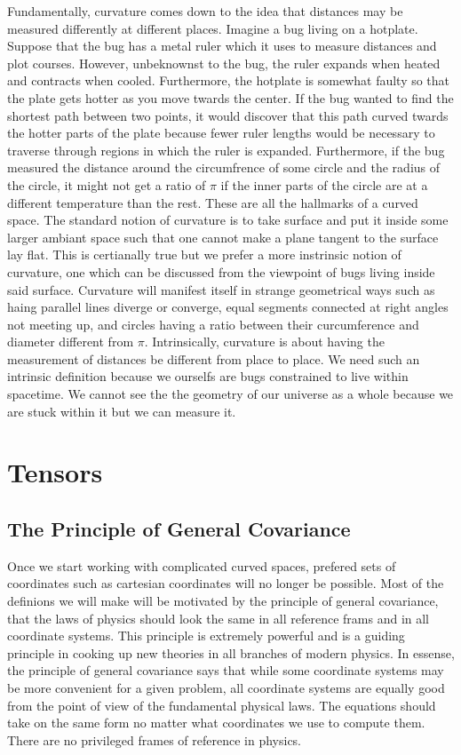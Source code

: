 \documentclass[11pt, a4paper]{article}
\begin{document}
Fundamentally, curvature comes down to the idea that distances may be measured differently at different places. Imagine a bug living on a hotplate. Suppose that the bug has a metal ruler which it uses to measure distances and plot courses. However, unbeknownst to the bug, the ruler expands when heated and contracts when cooled. Furthermore, the hotplate is somewhat faulty so that the plate gets hotter as you move twards the center. If the bug wanted to find the shortest path between two points, it would discover that this path curved twards the hotter parts of the plate because fewer ruler lengths would be necessary to traverse through regions in which the ruler is expanded. Furthermore, if the bug measured the distance around the circumfrence of some circle and the radius of the circle, it might not get a ratio of $\pi$ if the inner parts of the circle are at a different temperature than the rest. These are all the hallmarks of a curved space. The standard notion of curvature is to take surface and put it inside some larger ambiant space such that one cannot make a plane tangent to the surface lay flat. This is certianally true but we prefer a more instrinsic notion of curvature, one which can be discussed from the viewpoint of bugs living inside said surface. Curvature will manifest itself in strange geometrical ways such as haing parallel lines diverge or converge, equal segments connected at right angles not meeting up, and circles having a ratio between their curcumference and diameter different from $\pi$. Intrinsically, curvature is about having the measurement of distances be different from place to place. We need such an intrinsic definition because we ourselfs are bugs constrained to live within spacetime. We cannot see the the geometry of our universe as a whole because we are stuck within it but we can measure it.

\section{Tensors}

\subsection{The Principle of General Covariance}

Once we start working with complicated curved spaces, prefered sets of coordinates such as cartesian coordinates will no longer be possible. Most of the definions we will make will be motivated by the principle of general covariance, that the laws of physics should look the same in all reference frams and in all coordinate systems. This principle is extremely powerful and is a guiding principle in cooking up new theories in all branches of modern physics. In essense, the principle of general covariance says that while some coordinate systems may be more convenient for a given problem, all coordinate systems are equally good from the point of view of the fundamental physical laws. The equations should take on the same form no matter what coordinates we use to compute them. There are no privileged frames of reference in physics.   
\end{document}
